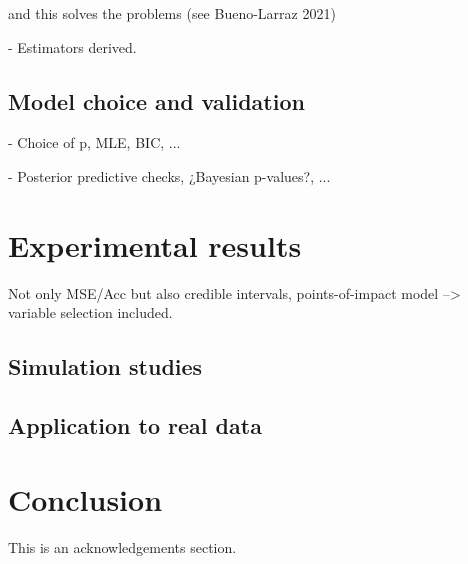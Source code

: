 \documentclass[ba]{imsart}
\numberwithin{equation}{section}
\theoremstyle{plain}
\newenvironment{comment}
{
\noindent \em \color{red}
}
{
\color{black}
}
\begin{document}
 and this solves the problems (see Bueno-Larraz 2021)

\begin{comment}
  - Estimators derived.
\end{comment}

\subsection{Model choice and validation}

\begin{comment}
  - Choice of p, MLE, BIC, ...

  - Posterior predictive checks, ¿Bayesian p-values?, ...
\end{comment}



\section{Experimental results}

\begin{comment}
  Not only MSE/Acc but also credible intervals, points-of-impact model --> variable selection included.
\end{comment}

\subsection{Simulation studies}

\subsection{Application to real data}

\section{Conclusion}

\begin{supplement}
\end{supplement}




\begin{acks}[Acknowledgments]
This is an acknowledgements section.
\end{acks}
\end{document}
